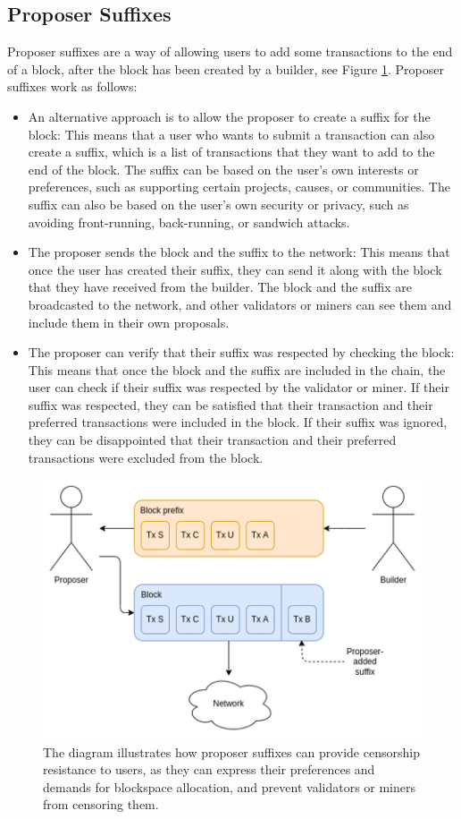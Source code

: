\documentclass{report}
\begin{document}
\subsection{Proposer Suffixes}
Proposer suffixes are a way of allowing users to add some transactions to the end of a block, after the block has been created by a builder, see Figure \ref{fig:f9}. Proposer suffixes work as follows:\\
\begin{itemize}
	\item An alternative approach is to allow the proposer to create a suffix for the block: This means that a user who wants to submit a transaction can also create a suffix, which is a list of transactions that they want to add to the end of the block. The suffix can be based on the user’s own interests or preferences, such as supporting certain projects, causes, or communities. The suffix can also be based on the user’s own security or privacy, such as avoiding front-running, back-running, or sandwich attacks.
	\item The proposer sends the block and the suffix to the network: This means that once the user has created their suffix, they can send it along with the block that they have received from the builder. The block and the suffix are broadcasted to the network, and other validators or miners can see them and include them in their own proposals.
	\item The proposer can verify that their suffix was respected by checking the block: This means that once the block and the suffix are included in the chain, the user can check if their suffix was respected by the validator or miner. If their suffix was respected, they can be satisfied that their transaction and their preferred transactions were included in the block. If their suffix was ignored, they can be disappointed that their transaction and their preferred transactions were excluded from the block.
\end{itemize}
  \begin{center}
	\begin{figure}
		\centering
		\includegraphics[width=0.7\linewidth]{Fig/F9}
		\caption{The diagram illustrates how proposer suffixes can provide censorship resistance to users, as they can express their preferences and demands for blockspace allocation, and prevent validators or miners from censoring them.}
		\label{fig:f9}
	\end{figure}
\end{center}
\end{document}

